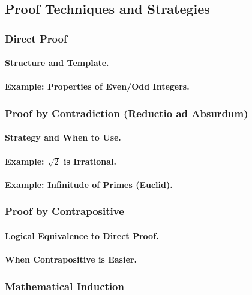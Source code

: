\subsection{Proof Techniques and Strategies}
\label{subsec:proof-techniques}

\subsubsection{Direct Proof}
\paragraph{Structure and Template.}
\paragraph{Example: Properties of Even/Odd Integers.}

\subsubsection{Proof by Contradiction (Reductio ad Absurdum)}
\paragraph{Strategy and When to Use.}
\paragraph{Example: $\sqrt{2}$ is Irrational.}
\paragraph{Example: Infinitude of Primes (Euclid).}

\subsubsection{Proof by Contrapositive}
\paragraph{Logical Equivalence to Direct Proof.}
\paragraph{When Contrapositive is Easier.}

\subsubsection{Mathematical Induction}
